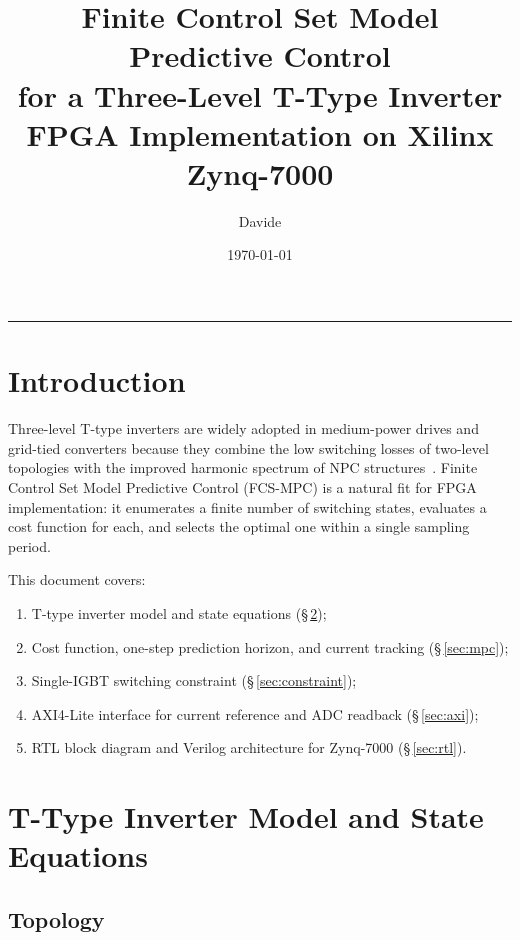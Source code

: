 \documentclass[11pt,a4paper]{article}
\begin{document}
\title{\textbf{Finite Control Set Model Predictive Control\\
for a Three-Level T-Type Inverter\\
\large FPGA Implementation on Xilinx Zynq-7000}}
\author{Davide}
\date{\today}
\maketitle
\tableofcontents
\bigskip\hrule\bigskip

\section{Introduction}
\label{sec:intro}

Three-level T-type inverters are widely adopted in medium-power drives and
grid-tied converters because they combine the low switching losses of
two-level topologies with the improved harmonic spectrum of NPC
structures~\cite{kolar2010ttype}.  Finite Control Set Model Predictive
Control (FCS-MPC) is a natural fit for FPGA implementation: it enumerates
a finite number of switching states, evaluates a cost function for each,
and selects the optimal one within a single sampling period.

This document covers:
\begin{enumerate}
  \item T-type inverter model and state equations (\S\,\ref{sec:model});
  \item Cost function, one-step prediction horizon, and current tracking
        (\S\,\ref{sec:mpc});
  \item Single-IGBT switching constraint (\S\,\ref{sec:constraint});
  \item AXI4-Lite interface for current reference and ADC readback
        (\S\,\ref{sec:axi});
  \item RTL block diagram and Verilog architecture for Zynq-7000
        (\S\,\ref{sec:rtl}).
\end{enumerate}

\section{T-Type Inverter Model and State Equations}
\label{sec:model}

\subsection{Topology}
\label{sec:topo}
\end{document}

